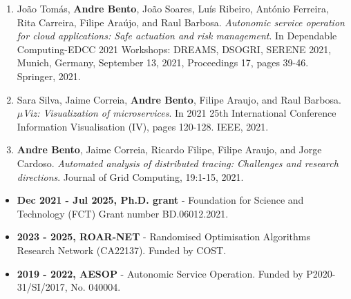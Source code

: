 \documentclass[a4paper,12pt]{memoir}
\begin{document}
\begin{enumerate}[leftmargin=*]
	\item João Tomás, \textbf{Andre Bento}, João Soares, Luís Ribeiro, António Ferreira, Rita Carreira, Filipe Araújo, and Raul Barbosa. \emph{Autonomic service operation for cloud applications: Safe actuation and risk management}. In Dependable Computing-EDCC 2021 Workshops: DREAMS, DSOGRI, SERENE 2021, Munich, Germany, September 13, 2021, Proceedings 17, pages 39-46. Springer, 2021.%
	\item Sara Silva, Jaime Correia, \textbf{Andre Bento}, Filipe Araujo, and Raul Barbosa. \emph{$\mu$Viz: Visualization of microservices}. In 2021 25th 
	International Conference Information Visualisation (IV), pages 120-128. 
	IEEE, 2021.%
	\item \textbf{Andre Bento}, Jaime Correia, Ricardo Filipe, Filipe Araujo, and Jorge Cardoso. \emph{Automated analysis of distributed tracing: Challenges and research directions}. Journal of Grid Computing, 19:1-15, 2021.%
\end{enumerate}

\Sep


\begin{itemize}[leftmargin=*]
    \item \textbf{Dec 2021 - Jul 2025, Ph.D. grant} - Foundation for Science and Technology (FCT) Grant number BD.06012.2021.
    \item \textbf{2023 - 2025, ROAR-NET} - Randomised Optimisation Algorithms Research Network (CA22137). Funded by COST.
    \item \textbf{2019 - 2022, AESOP} - Autonomic Service Operation. Funded by P2020-31/SI/2017, No. 040004.
\end{itemize}
\end{document}

